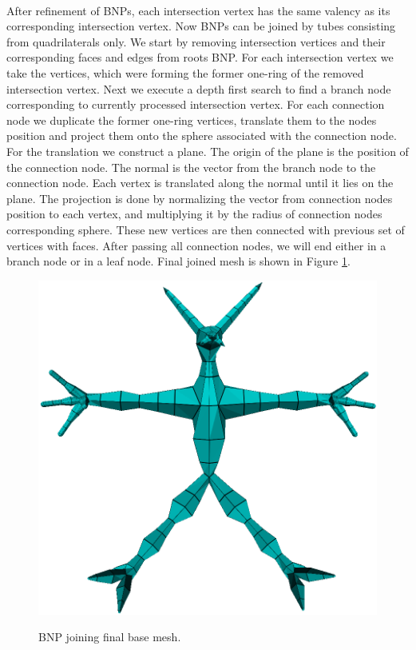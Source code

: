 \paragraph{}
After refinement of BNPs, each intersection vertex has the same valency as its corresponding intersection vertex. Now BNPs can be joined by tubes consisting from quadrilaterals only. We start by removing intersection vertices and their corresponding faces and edges from roots BNP. For each intersection vertex we take the vertices, which were forming the former one-ring of the removed intersection vertex. Next we execute a depth first search to find a branch node corresponding to currently processed intersection vertex. For each connection node we duplicate the former one-ring vertices, translate them to the nodes position and project them onto the sphere associated with the connection node. For the translation we construct a plane. The origin of the plane is the position of the connection node. The normal is the vector from the branch node to the connection node. Each vertex is translated along the normal until it lies on the plane. The projection is done by normalizing the vector from connection nodes position to each vertex, and multiplying it by the radius of connection nodes corresponding sphere. These new vertices are then connected with previous set of vertices with faces. After passing all connection nodes, we will end either in a branch node or in a leaf node. Final joined mesh is shown in Figure \ref{fig:joined_ilu}.

\begin{figure}[h]
    \centering
    \includegraphics[width=\textwidth]{images/joined.png}
    \label{fig:joined_ilu}
    \caption[BNP joining]{BNP joining final base mesh.}
\end{figure}

